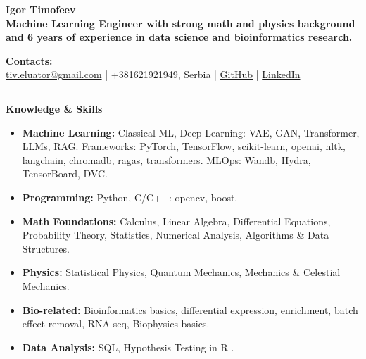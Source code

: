 \documentclass[12pt]{article}   %
\begin{document}
\begin{center}
    {\Huge \textbf{Igor Timofeev}}\\[6pt]
    \textbf{Machine Learning Engineer with strong math and physics background and 6 years of experience in data science and bioinformatics research.}\\
\end{center}

\vspace{1em}

\noindent\textbf{Contacts:}\\
\href{mailto:tiv.eluator@gmail.com}{tiv.eluator@gmail.com} \quad | \quad
+381621921949, Serbia \quad | \quad
\href{https://github.com/eluator}{GitHub} \quad | \quad
\href{https://www.linkedin.com/in/itimofeev}{LinkedIn}

\vspace{0.4em}
\hrule
\vspace{0.4em}

\noindent \textbf{\Large Knowledge \& Skills}
\begin{itemize}
    \item \textbf{Machine Learning:} Classical ML, Deep Learning: VAE, GAN, Transformer, LLMs, RAG. Frameworks: PyTorch, TensorFlow, scikit-learn, openai, nltk, langchain, chromadb, ragas, transformers. MLOps: Wandb, Hydra, TensorBoard, DVC.
    \item \textbf{Programming:} Python, C/C++: opencv, boost.
    \item \textbf{Math Foundations:} Calculus, Linear Algebra, Differential Equations, Probability Theory, Statistics, Numerical Analysis, Algorithms \& Data Structures.
    \item \textbf{Physics:} Statistical Physics, Quantum Mechanics, Mechanics \& Celestial Mechanics.
    \item \textbf{Bio-related:} Bioinformatics basics, differential expression, enrichment, batch effect removal, RNA-seq, Biophysics basics.
    \item \textbf{Data Analysis:} SQL, Hypothesis Testing in R \href{https://github.com/eluator/DataAnalysisInR}{\faGithub}.
\end{itemize}

\vspace{1em}
\end{document}
